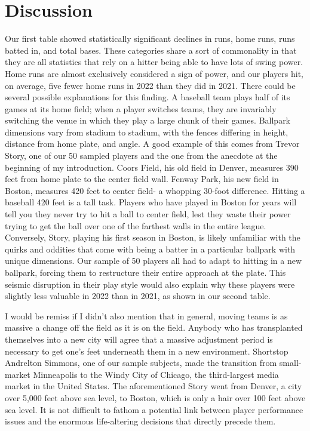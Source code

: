 \documentclass[10pt]{article}
\begin{document}
\section{Discussion}

Our first table showed statistically significant declines in runs, home runs, runs batted in, and total bases. These categories 
share a sort of commonality in that they are all statistics that rely on a hitter being able to have lots of swing power. Home 
runs are almost exclusively considered a sign of power, and our players hit, on average, five fewer home runs in 2022 than they 
did in 2021. There could be several possible explanations for this finding. A baseball team plays half of its games at its home 
field; when a player switches teams, they are invariably switching the venue in which they play a large chunk of their games. 
Ballpark dimensions vary from stadium to stadium, with the fences differing in height, distance from home plate, and angle. A 
good example of this comes from Trevor Story, one of our 50 sampled players and the one from the anecdote at the beginning of 
my introduction. Coors Field, his old field in Denver, measures 390 feet from home plate to the center field wall. Fenway Park, 
his new field in Boston, measures 420 feet to center field- a whopping 30-foot difference. Hitting a baseball 420 feet is a 
tall task. Players who have played in Boston for years will tell you they never try to hit a ball to center field, lest they 
waste their power trying to get the ball over one of the farthest walls in the entire league. Conversely, Story, playing his 
first season in Boston, is likely unfamiliar with the quirks and oddities that come with being a batter in a particular ballpark 
with unique dimensions. Our sample of 50 players all had to adapt to hitting in a new ballpark, forcing them to restructure 
their entire approach at the plate. This seismic disruption in their play style would also explain why these players were 
slightly less valuable in 2022 than in 2021, as shown in our second table. 

I would be remiss if I didn’t also mention that in general, moving teams is as massive a change off the field as it is on the 
field. Anybody who has transplanted themselves into a new city will agree that a massive adjustment period is necessary  
to get one’s feet underneath them in a new environment. Shortstop Andrelton Simmons, one of our sample subjects, made 
the transition from small-market Minneapolis to the Windy City of Chicago, the third-largest media market in the United States. 
The aforementioned Story went from Denver, a city over 5,000 feet above sea level, to Boston, which is only a hair over 100 
feet above sea level. It is not difficult to fathom a potential link between player performance issues and the enormous 
life-altering decisions that directly precede them. 
\end{document}
